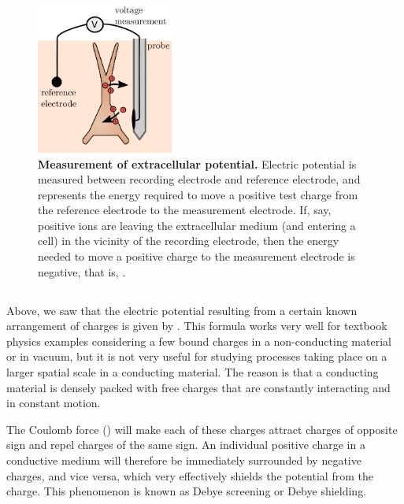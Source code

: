 \begin{figure}[!ht]
\begin{center}
\includegraphics[width=0.4\textwidth]{Figures/Basics/rec_elec_circuit.png}
\end{center}
\caption[]{\textbf{Measurement of extracellular potential.}
Electric potential is measured between recording electrode and reference electrode, and represents the energy required to move a positive test charge from the reference electrode to the measurement electrode. If, say, positive ions are leaving the extracellular medium (and entering a cell) in the vicinity of the recording electrode, then the energy needed to move a positive charge to the measurement electrode is negative, that is, .}
\label{fig:Basics:elec_circuit}
\end{figure}


\subsection{}
\label{sec:Basics:Debye}
Above, we saw that the electric potential resulting from a certain known arrangement of charges is given by . This formula works very well for textbook physics examples considering a few bound charges in a non-conducting material or in vacuum, but it is not very useful for studying processes taking place on a larger spatial scale in a conducting material. The reason is that a conducting material is densely packed with free charges that are constantly interacting and in constant motion. 

The Coulomb force () will make each of these charges attract charges of opposite sign and repel charges of the same sign. An individual positive charge in a conductive medium will therefore be immediately surrounded by negative charges, and vice versa, which very effectively shields the potential from the charge. This phenomenon is known as Debye screening or Debye shielding. 

